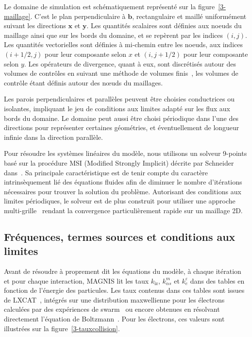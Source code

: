 \begin{refsection}
Le domaine de simulation est schématiquement représenté sur la figure~\ref{3-maillage}.
C'est le plan perpendiculaire à $\mathbf{b}$, rectangulaire et maillé uniformément suivant
les directions $\mathbf{x}$ et $\mathbf{y}$. Les quantités
scalaires sont définies aux noeuds du maillage ainsi que sur les bords du
domaine, et se repèrent par les indices $(i,j)$. Les quantités vectorielles
sont définies à mi-chemin entre les noeuds, aux indices $(i+1/2,j)$ pour leur
composante selon $x$ et $(i,j+1/2)$ pour leur composante selon $y$.
Les opérateurs
de divergence, quant à eux, sont discrétisés autour des volumes de contrôles en
suivant une méthode de volumes finis~\parencite{toro}, les volumes de
contrôle étant définis autour des n\oe uds du maillages. 

Les parois perpendiculaires et parallèles peuvent être choisies conductrices ou
isolantes, impliquant le jeu de conditions aux limites adapté sur les flux
aux bords du domaine. Le domaine peut aussi être choisi périodique dans l'une
des directions pour représenter certaines géométries, et éventuellement
de longueur infinie dans la direction parallèle.
 
Pour résoudre les systèmes linéaires du modèle, nous utilisons un solveur
9-points basé sur la procédure
MSI (Modified Strongly Implicit) décrite par Schneider
dans~\parencite{Schneider}. Sa principale caractéristique est de tenir
compte du caractère intrinsèquement lié des équations fluides afin de diminuer
le nombre d'itérations nécessaires pour trouver la solution du problème. Autorisant des
conditions aux limites périodiques, le solveur est de plus construit pour
utiliser une approche multi-grille~\parencite{Fedorenko} rendant la convergence
particulièrement rapide sur un maillage 2D.

\subsection{Fréquences, termes sources et conditions aux limites}
Avant de résoudre à proprement dit les équations du modèle, à chaque
itération et pour chaque interaction, MAGNIS lit les taux $k_\text{iz}$,
$k^m_{\alpha s}$ et $k^\varepsilon_{e}$ dans des tables en fonction
de l'énergie des particules. 
Les taux contenus dans ces tables
sont issues de LXCAT~\parencite{LXCAT}, intégrés sur une distribution
maxwellienne pour les électrons calculées par des expériences de
swarm~\parencite{Ellis} ou encore obtenues en résolvant directement l'équation
de Boltzmann~\parencite{Bolsig}. Pour les électrons, ces valeurs sont
illustrées sur la figure~\ref{3-tauxcollision}.


\end{refsection}
